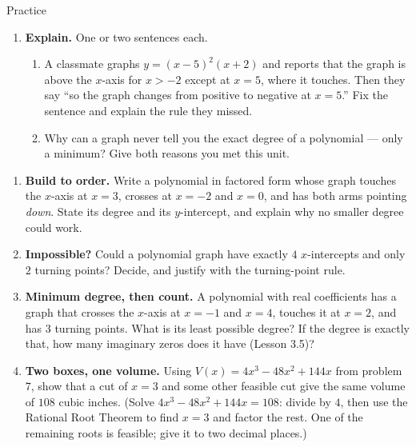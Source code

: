 \documentclass[10pt]{article}
\begin{document}
\begin{notesbox}{Practice}
\begin{enumerate}[leftmargin=1.9em, itemsep=8pt]
  \item \textbf{Explain.} One or two sentences each.
    \begin{enumerate}[label=(\alph*), leftmargin=1.8em, itemsep=4pt]
      \item A classmate graphs $y=(x-5)^2(x+2)$ and reports that the graph is above the $x$-axis for
        $x>-2$ except at $x=5$, where it touches. Then they say ``so the graph changes from positive
        to negative at $x=5$.'' Fix the sentence and explain the rule they missed. 
      \item Why can a graph never tell you the exact degree of a polynomial --- only a minimum?
        Give both reasons you met this unit. 
    \end{enumerate}
\end{enumerate}
\end{notesbox}

\begin{extensionbox}
\begin{enumerate}[label=(\alph*), leftmargin=1.8em, itemsep=5pt]
  \item \textbf{Build to order.} Write a polynomial in factored form whose graph touches the
        $x$-axis at $x=3$, crosses at $x=-2$ and $x=0$, and has both arms pointing \emph{down}.
        State its degree and its $y$-intercept, and explain why no smaller degree could work.
  \item \textbf{Impossible?} Could a polynomial graph have exactly $4$ $x$-intercepts and only
        $2$ turning points? Decide, and justify with the turning-point rule.
  \item \textbf{Minimum degree, then count.} A polynomial with real coefficients has a graph that
        crosses the $x$-axis at $x=-1$ and $x=4$, touches it at $x=2$, and has $3$ turning points.
        What is its least possible degree? If the degree is exactly that, how many imaginary zeros
        does it have (Lesson 3.5)?
  \item \textbf{Two boxes, one volume.} Using $V(x)=4x^3-48x^2+144x$ from problem 7, show that a
        cut of $x=3$ and some other feasible cut give the same volume of $108$ cubic inches. (Solve
        $4x^3-48x^2+144x=108$: divide by $4$, then use the Rational Root Theorem to find $x=3$ and
        factor the rest. One of the remaining roots is feasible; give it to two decimal places.)
\end{enumerate}
\end{extensionbox}
\end{document}
